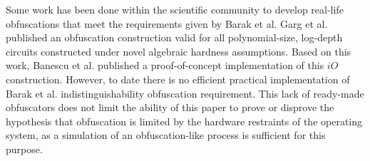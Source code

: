 Some work has been done within the scientific community to develop real-life obfuscations that meet the requirements given by Barak et al. Garg et al.\cite{garg} published an obfuscation construction valid for all polynomial-size, log-depth circuits constructed under novel algebraic hardness assumptions. Based on this work, Banescu et al.\cite{tum} published a proof-of-concept implementation of this $iO$ construction.
However, to date there is no efficient practical implementation of Barak et al.\cite{barak} indistinguishability obfuscation requirement. 
This lack of ready-made obfuscators does not limit the ability of this paper to prove or disprove the hypothesis that obfuscation is limited by the hardware restraints of the operating system, as a simulation of an obfuscation-like process is sufficient for this purpose.

